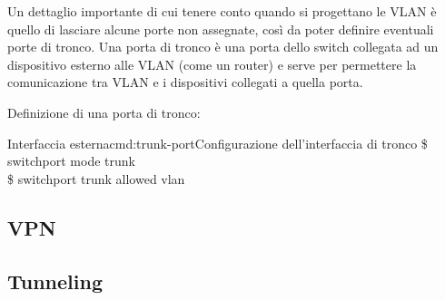Un dettaglio importante di cui tenere conto quando si progettano le VLAN è quello di lasciare alcune porte non assegnate, così da poter definire eventuali porte di tronco. Una porta di tronco è una porta dello switch collegata ad un dispositivo esterno alle VLAN (come un router) e serve per permettere la comunicazione tra VLAN e i dispositivi collegati a quella porta.

Definizione di una porta di tronco:

\begin{cmds}[Switch]{Interfaccia esterna}{cmd:trunk-port}{Configurazione dell'interfaccia di tronco}
    \$ switchport mode trunk\\
    \$ switchport trunk allowed vlan
\end{cmds}

\subsection{VPN}
\subsection{Tunneling}
